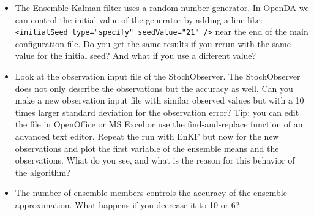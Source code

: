\begin{itemize}
        \begin{lstlisting}[language=Python,frame=single,caption={Python initialize}]
        import simulation_truth_results as truth
        import simulation_initial_results as initial
        import simulation_enkf_results as enkf
        plt.subplot(2,1,1)
        plt.plot(initial.model_time,initial.x[:,0],"g")
        plt.plot(truth.model_time,truth.x[:,0],"k")
        plt.plot(enkf.analysis_time,enkf.x_f_central[:,0],"b");
        plt.legend(("initial","truth","EnKF"))
        plt.ylabel(r"$\theta_1$")
        plt.subplot(2,1,2)
        plt.plot(initial.model_time,initial.x[:,1],"g")
        plt.plot(truth.model_time,truth.x[:,1],"k")
        plt.plot(enkf.analysis_time,enkf.x_f_central[:,1],"b");
        plt.ylabel(r"$\theta_2$")
        plt.xlabel(r"$t$")
        plt.show() 
        \end{lstlisting}

 \item The Ensemble Kalman filter uses a random number generator. In OpenDA we can control 
       the initial value of the generator by adding a line like:
       \verb|<initialSeed type="specify" seedValue="21" />| near the end of the main configuration file.
       Do you get the same results if you rerun with the same value for the initial seed? And what if 
       you use a different value?
        
 \item Look at the observation input file of the StochObserver. The
       StochObserver does not only describe the observations but the accuracy
       as well. Can you make a new observation input file with similar
       observed values but with a 10 times larger standard deviation for the
       observation error?
       Tip: you can edit the file in OpenOffice or MS Excel or use the find-and-replace function of an advanced text editor.
       Repeat the run with EnKF but now for the new observations and plot
       the first variable of the ensemble means and the observations. What do
       you see, and what is the reason for this behavior of the algorithm?
 \item The number of ensemble members controls the accuracy of the ensemble
       approximation. What happens if you decrease it to 10 or 6? 
       
\end{itemize}


